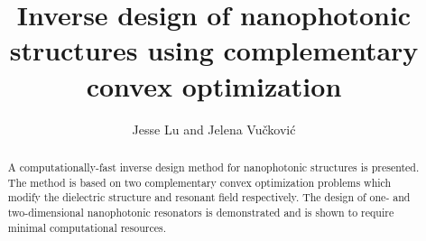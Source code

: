 \documentclass[10pt,letterpaper]{article}
\begin{document}
\title{Inverse design of nanophotonic structures using complementary convex optimization}
\author{Jesse Lu and Jelena Vu\v{c}kovi\'{c}}
\address{E.~L.~Ginzton Laboratory, Stanford University, Stanford, CA 94305-4085, U.~S.~A.}

\begin{abstract}
A computationally-fast inverse design method for nanophotonic structures is presented. The method is based on two complementary convex optimization problems which modify the dielectric structure and resonant field respectively. The design of one- and two-dimensional nanophotonic resonators is demonstrated and is shown to require minimal computational resources.
\end{abstract}

\end{document}
